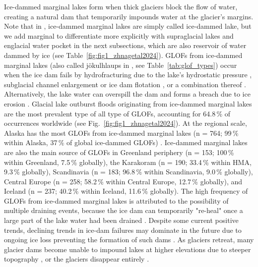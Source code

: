 Ice-dammed marginal lakes form when thick glaciers block the flow of water, creating a natural dam that temporarily impounds water at the glacier's margins. Note that in \cite{Lutzow&al2023,Zhang&al2024}, ice-dammed marginal lakes are simply called ice-dammed lake, but we add marginal to differentiate more explicitly with supraglacial lakes and englacial water pocket in the next subsections, which are also reservoir of water dammed by ice (see Table~\ref{fig:fig1_zhnagetal2024}). GLOFs from ice-dammed marginal lakes (also called jökulhlaups in \cite{Bjornsson2010}, see Table~\ref{tab:glof_types}) occur when the ice dam fails by hydrofracturing due to the lake's hydrostatic pressure \citep[e.g. in][]{Lindner&al2020}, subglacial channel enlargement \citep{Nye1976} or ice dam flotation \citep[e.g. in][]{Liestol1956}, or a combination thereof \citep{Flowers&al2004}\citep[see also][for a review on the physical aspects of these mechanisms]{Flowers2015}. Alternatively, the lake water can overspill the dam and forms a breach due to ice erosion \citep[e.g.][]{Walder&Costa1996,Raymond&Nolan2000,Mayer&Schuler2005}. Glacial lake outburst floods originating from ice-dammed marginal lakes are the most prevalent type of all type of GLOFs, accounting for 64.8\,\% of occurrences worldwide (see Fig.~\ref{fig:fig1_zhnagetal2024}). At the regional scale, Alaska has the most GLOFs from ice-dammed marginal lakes (n = 764; 99\,\% within Alaska, 37\,\% of global ice-dammed GLOFs) \citep{Emmer&al2022}. Ice-dammed marginal lakes are also the main source of GLOFs in Greenland periphery (n = 153; 100\,\% within Greenland, 7.5\,\% globally), the Karakoram (n = 190; 33.4\,\% within HMA, 9.3\,\% globally), Scandinavia (n = 183; 96.8\,\% within Scandinavia, 9.0\,\% globally), Central Europe (n = 258; 58.2\,\% within Central Europe, 12.7\,\% globally), and Iceland (n = 237; 40.2\,\% within Iceland, 11.6\,\% globally)\citep{Zhang&al2024}. The high frequency of GLOFs from ice-dammed marginal lakes is attributed to the possibility of multiple draining events, because the ice dam can temporarily "re-heal" once a large part of the lake water had been drained \citep{Zhang&al2024}. Despite some current positive trends, declining trends in ice-dam failures may dominate in the future due to ongoing ice loss preventing the formation of such dams \citep{Rick&al2022}. As glaciers retreat, many glacier dams become unable to impound lakes at higher elevations due to steeper topography \cite{Zhang&al2024}, or the glaciers disappear entirely \citep[e.g.][]{Geertsema&Clague2005,Tweed&Russel1999}. %

